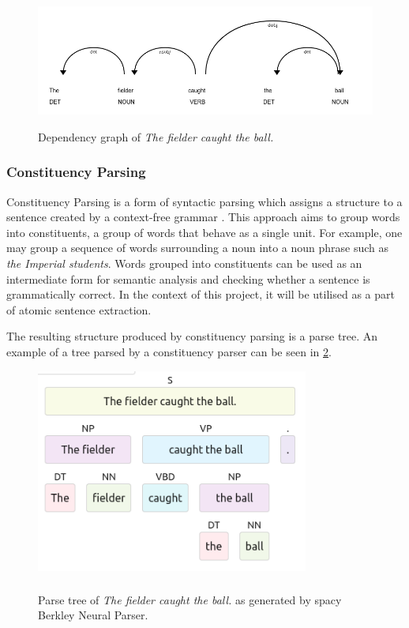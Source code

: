 \begin{figure}[h]
\caption{Dependency graph of \emph{The fielder caught the ball.}}
\centering
\includegraphics[width=\textwidth]{background/dependency_graph.png}
\label{dependency-graph}
\end{figure}

\subsubsection{Constituency Parsing}

Constituency Parsing is a form of syntactic parsing which assigns a structure to a sentence created by a context-free grammar \cite{RefWorks:RefID:28-jurafsky2014speech}.
This approach aims to group words into constituents, a group of words that behave as a single unit.
For example, one may group a sequence of words surrounding a noun into a noun phrase such as \emph{the Imperial students}.
Words grouped into constituents can be used as an intermediate form for semantic analysis and checking whether a sentence is grammatically correct.
In the context of this project, it will be utilised as a part of atomic sentence extraction.


The resulting structure produced by constituency parsing is a parse tree. 
An example of a tree parsed by a constituency parser can be seen in \ref{constituency-graph}.

\begin{figure}[h]
\caption{Parse tree of \emph{The fielder caught the ball.} as generated by spacy Berkley Neural Parser.}
\centering
\includegraphics[width=0.8\textwidth]{background/constituency parse.png}
\label{constituency-graph}
\end{figure}

